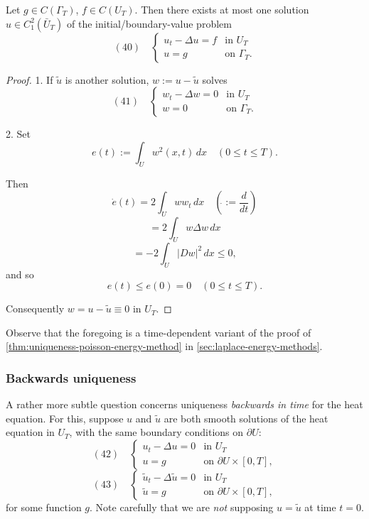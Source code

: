 \begin{theorem}
\label{thm:uniqueness-heat-energy-method}
Let $g \in C(\Gamma_T)$, $f \in C(U_T)$. Then there exists at most one solution $u \in C_1^2(\bar{U}_T)$ of the initial/boundary-value problem
$$(40) \quad \begin{cases}
u_t - \Delta u = f & \text{in } U_T \\
u = g & \text{on } \Gamma_T.
\end{cases}$$
\end{theorem}

\begin{proof}
1. If $\tilde{u}$ is another solution, $w := u - \tilde{u}$ solves
$$(41) \quad \begin{cases} w_t - \Delta w = 0 & \text{in } U_T \\ w = 0 & \text{on } \Gamma_T. \end{cases}$$

2. Set
$$e(t) := \int_U w^2(x,t)\,dx \quad (0 \le t \le T).$$

Then
$$\dot{e}(t) = 2\int_U ww_t\,dx \quad \left(\dot{} := \frac{d}{dt}\right)$$
$$= 2\int_U w\Delta w\,dx$$
$$= -2\int_U |Dw|^2\,dx \le 0,$$
and so
$$e(t) \le e(0) = 0 \quad (0 \le t \le T).$$

Consequently $w = u - \tilde{u} \equiv 0$ in $U_T$.
\end{proof}

Observe that the foregoing is a time-dependent variant of the proof of \cref{thm:uniqueness-poisson-energy-method} in \cref{sec:laplace-energy-methods}.

\subsubsection{Backwards uniqueness}
\label{sec:heat-backwards-uniqueness}

A rather more subtle question concerns uniqueness \textit{backwards in time} for the heat equation. For this, suppose $u$ and $\tilde{u}$ are both smooth solutions of the heat equation in $U_T$, with the same boundary conditions on $\partial U$:
$$(42) \quad \begin{cases} u_t - \Delta u = 0 & \text{in } U_T \\ u = g & \text{on } \partial U \times [0,T], \end{cases}$$
$$(43) \quad \begin{cases} \tilde{u}_t - \Delta \tilde{u} = 0 & \text{in } U_T \\ \tilde{u} = g & \text{on } \partial U \times [0,T], \end{cases}$$
for some function $g$. Note carefully that we are \textit{not} supposing $u = \tilde{u}$ at time $t = 0$.


